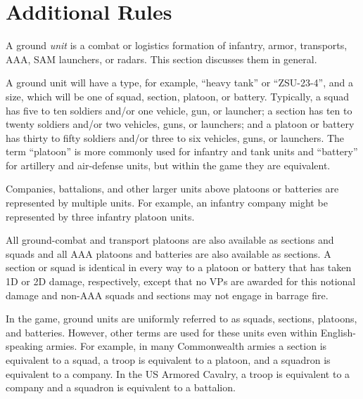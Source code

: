 
\chapter{Additional Rules}


A ground \emph{unit} is a combat or logistics formation of infantry, armor, transports, AAA, SAM launchers, or radars. This section discusses them in general.%


A ground unit will have a type, for example, “heavy tank” or “ZSU-23-4”, and a size, which will be one of squad, section, platoon, or battery. Typically, a squad has five to ten soldiers and/or one vehicle, gun, or launcher; a section has ten to twenty soldiers and/or two vehicles, guns, or launchers; and a platoon or battery has thirty to fifty soldiers and/or three to six vehicles, guns, or launchers.
The term “platoon” is more commonly used for infantry and tank units and “battery” for artillery and air-defense units, but within the game they are equivalent.

Companies, battalions, and other larger units above platoons or batteries are represented by multiple units. For example, an infantry company might be represented by three infantry platoon units.

All ground-combat and transport platoons are also available as sections and squads and all AAA platoons and batteries are also available as sections.
A section or squad is identical in every way to a platoon or battery that has taken 1D or 2D damage, respectively, except that no VPs are awarded for this notional damage and non-AAA squads and sections may not engage in barrage fire.%

In the game, ground units are uniformly referred to as squads, sections, platoons, and batteries. However, other terms are used for these units even within English-speaking armies.
For example, in many Commonwealth armies a section is equivalent to a squad, a troop is equivalent to a platoon, and a squadron is equivalent to a company.
In the US Armored Cavalry, a troop is equivalent to a company and a squadron is equivalent to a battalion.

